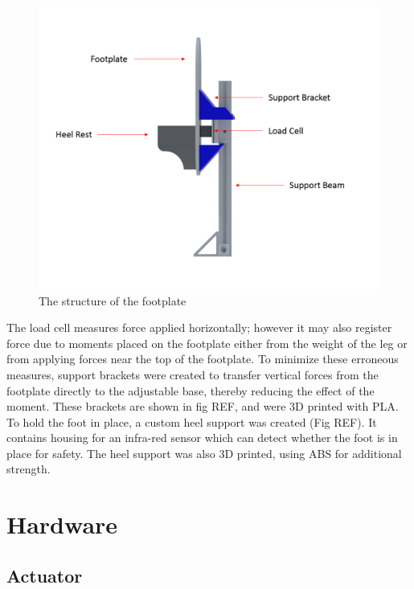 \documentclass[12pt]{report}
\begin{document}
	
	\begin{figure}[h] 
		\centering
		\includegraphics[width=\linewidth]{footplate_label}
		\caption{The structure of the footplate}
		\label{fig:footplate_label}
	\end{figure}
	

	The load cell measures force applied horizontally; however it may also register force due to moments placed on the footplate either from the weight of the leg or from applying forces near the top of the footplate. To minimize these erroneous measures, support brackets were created to transfer vertical forces from the footplate directly to the adjustable base, thereby reducing the effect of the moment. These brackets are shown in fig REF, and were 3D printed with PLA. To hold the foot in place, a custom heel support was created (Fig REF). It contains housing for an infra-red sensor which can detect whether the foot is in place for safety. The heel support was also 3D printed, using ABS for additional strength. 
	
	\section{Hardware}
		\subsection{Actuator}	
		
\end{document}
